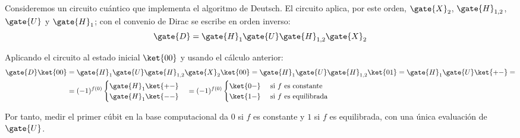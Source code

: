 Consideremos un circuito cuántico que implementa el algoritmo de Deutsch.
El circuito aplica, por este orden, $\gate{X}_2$, $\gate{H}_{1,2}$, $\gate{U}$ y $\gate{H}_1$; con el convenio de Dirac se escribe en orden inverso:
\[
  \gate{D}=\gate{H}_1\gate{U}\gate{H}_{1,2}\gate{X}_2
\]

Aplicando el circuito al estado inicial $\ket{00}$ y usando el cálculo anterior:
\begin{equation}
  \label{eq:deutchs-circuit}
  \begin{split}
    \gate{D}\ket{00} & =\gate{H}_1\gate{U}\gate{H}_{1,2}\gate{X}_2\ket{00}=\gate{H}_1\gate{U}\gate{H}_{1,2}\ket{01}=\gate{H}_1\gate{U}\ket{+-}= \\
                     & =(-1)^{f(0)}
    \begin{cases}
      \gate{H}_1\ket{+-} \\
      \gate{H}_1\ket{--}
    \end{cases}
    =(-1)^{f(0)}
    \begin{cases}
      \ket{0-} & \text{ si $f$ es constante}   \\
      \ket{1-} & \text{ si $f$ es equilibrada}
    \end{cases}
  \end{split}
\end{equation}

Por tanto, medir el primer cúbit en la base computacional da $0$ si $f$ es constante y $1$ si $f$ es equilibrada, con una única evaluación de $\gate{U}$.
